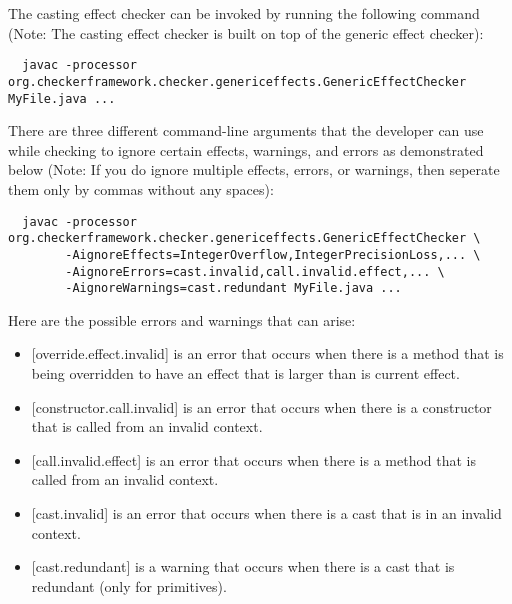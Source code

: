 
The casting effect checker can be invoked by running the following command (Note: The casting effect checker is built on top of the generic effect checker):
\begin{Verbatim}
  javac -processor org.checkerframework.checker.genericeffects.GenericEffectChecker MyFile.java ...
\end{Verbatim}

There are three different command-line arguments that the developer can use while checking to ignore certain effects, warnings, and errors as demonstrated below (Note: If you do ignore multiple effects, errors, or warnings, then seperate them only by commas without any spaces):
\begin{Verbatim}
  javac -processor org.checkerframework.checker.genericeffects.GenericEffectChecker \
        -AignoreEffects=IntegerOverflow,IntegerPrecisionLoss,... \
        -AignoreErrors=cast.invalid,call.invalid.effect,... \
        -AignoreWarnings=cast.redundant MyFile.java ...
\end{Verbatim}


Here are the possible errors and warnings that can arise:
\begin{itemize}
\item
{[override.effect.invalid]} is an error that occurs when there is a method that is being overridden to have an effect that is larger than is current effect.
\item
{[constructor.call.invalid]} is an error that occurs when there is a constructor that is called from an invalid context.
\item
{[call.invalid.effect]} is an error that occurs when there is a method that is called from an invalid context.
\item
{[cast.invalid]} is an error that occurs when there is a cast that is in an invalid context.
\item
{[cast.redundant]} is a warning that occurs when there is a cast that is redundant (only for primitives).
\end{itemize}


